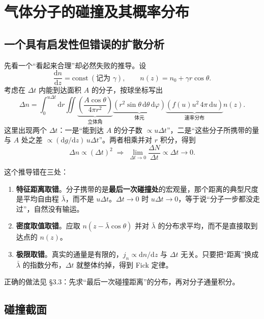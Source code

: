 \documentclass[11pt,a4paper,openany]{ctexbook}
\newcommand{\dd}{\mathrm d}
\begin{document}
\section{气体分子的碰撞及其概率分布}

\subsection*{一个具有启发性但错误的扩散分析}

先看一个“看起来合理”却必然失败的推导。设
\[
\frac{\dd n}{\dd z}=\text{const}\ (\text{记为 }\gamma),
\qquad
n(z)=n_0+\gamma r\cos\theta .
\]
考虑在 $\Delta t$ 内能到达面积 $A$ 的分子，按球坐标写出
\[
\Delta n=\int_0^{u\Delta t}\!\!\dd r\iint
\underbrace{\left(\frac{A\cos\theta}{4\pi r^2}\right)}_{\text{立体角}}
\underbrace{\left(r^2\sin\theta\,\dd\theta\,\dd\varphi\right)}_{\text{体元}}
\underbrace{\left(f(u)u^2\,4\pi\,\dd u\right)}_{\text{速率分布}}
n(z).
\]
这里出现两个 $\Delta t$：一是“能到达 $A$ 的分子数 $\propto u\Delta t$”，二是“这些分子所携带的量与 $A$ 处之差 $\propto(\dd g/\dd z)\,u\Delta t$”。两者相乘并对 $r$ 积分，得到
\[
\Delta n\propto(\Delta t)^2
\;\Longrightarrow\;
\lim_{\Delta t\to0}\frac{\Delta N}{\Delta t}\propto\Delta t\to0 .
\]

\begin{notebox}[title={结论：$\Delta t\to0$ 时无输运，与实际不符！}]
这个推导错在三处：
\begin{enumerate}[leftmargin=1.8em,itemsep=1pt]
\item \textbf{特征距离取错}。分子携带的是\textbf{最后一次碰撞处}的宏观量，那个距离的典型尺度是平均自由程 $\bar\lambda$，而不是 $u\Delta t$。$\Delta t\to0$ 时 $u\Delta t\to0$，等于说“分子一步都没走过”，自然没有输运。
\item \textbf{密度取值取错}。应取 $n(z-\bar\lambda\cos\theta)$ 并对 $\bar\lambda$ 的分布求平均，而不是直接取到达点的 $n(z)$。
\item \textbf{极限取错}。真实的通量是有限的，$j_n\propto\dd n/\dd z$ 与 $\Delta t$ 无关。只要把“距离”换成 $\bar\lambda$ 的指数分布，$\Delta t$ 就整体约掉，得到 Fick 定律。
\end{enumerate}
正确的做法见 §3.3：先求“最后一次碰撞距离”的分布，再对分子通量积分。
\end{notebox}

\subsection*{碰撞截面}
\end{document}
